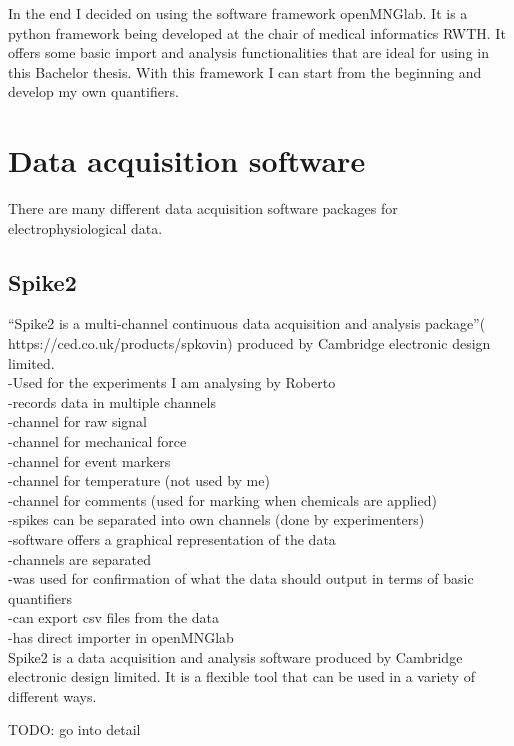 In the end I decided on using the software framework openMNGlab. It is a python framework being developed at the chair of medical informatics RWTH. It offers some basic import and analysis functionalities that are ideal for using in this Bachelor thesis. With this framework I can start from the beginning and develop my own quantifiers. 


\section{Data acquisition software} 
There are many different data acquisition software packages for electrophysiological data. 

\subsection{Spike2}
“Spike2 is a multi-channel continuous data acquisition and analysis package”( https://ced.co.uk/products/spkovin) produced by Cambridge electronic design limited. \\
-Used for the experiments I am analysing by Roberto \\
-records data in multiple channels \\
-channel for raw signal \\
-channel for mechanical force \\
-channel for event markers \\
-channel for temperature (not used by me) \\
-channel for comments (used for marking when chemicals are applied) \\
-spikes can be separated into own channels (done by experimenters) \\
-software offers a graphical representation of the data \\
-channels are separated \\
-was used for confirmation of what the data should output in terms of basic quantifiers \\
-can export csv files from the data \\
-has direct importer in openMNGlab \\

Spike2 is a data acquisition and analysis software produced by Cambridge electronic design limited. It is a flexible tool that can be used in a variety of different ways.

TODO: go into detail\\

